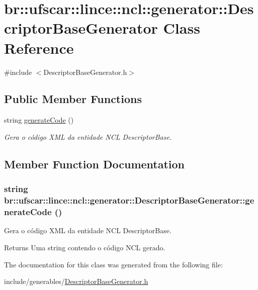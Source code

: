 \hypertarget{classbr_1_1ufscar_1_1lince_1_1ncl_1_1generator_1_1DescriptorBaseGenerator}{
\section{br::ufscar::lince::ncl::generator::DescriptorBaseGenerator Class Reference}
\label{classbr_1_1ufscar_1_1lince_1_1ncl_1_1generator_1_1DescriptorBaseGenerator}
}


{\ttfamily \#include $<$DescriptorBaseGenerator.h$>$}

\subsection*{Public Member Functions}
\begin{DoxyCompactItemize}
\item 
string \hyperlink{classbr_1_1ufscar_1_1lince_1_1ncl_1_1generator_1_1DescriptorBaseGenerator_a7b3d8c8df9e94e236e11f384b167e22e}{generateCode} ()
\begin{DoxyCompactList}\small\item\em Gera o código XML da entidade NCL DescriptorBase. \item\end{DoxyCompactList}\end{DoxyCompactItemize}


\subsection{Member Function Documentation}
\hypertarget{classbr_1_1ufscar_1_1lince_1_1ncl_1_1generator_1_1DescriptorBaseGenerator_a7b3d8c8df9e94e236e11f384b167e22e}{
\subsubsection[{generateCode}]{\setlength{\rightskip}{0pt plus 5cm}string br::ufscar::lince::ncl::generator::DescriptorBaseGenerator::generateCode ()}}
\label{classbr_1_1ufscar_1_1lince_1_1ncl_1_1generator_1_1DescriptorBaseGenerator_a7b3d8c8df9e94e236e11f384b167e22e}


Gera o código XML da entidade NCL DescriptorBase. 

\begin{DoxyReturn}{Returns}
Uma string contendo o código NCL gerado. 
\end{DoxyReturn}


The documentation for this class was generated from the following file:\begin{DoxyCompactItemize}
\item 
include/generables/\hyperlink{DescriptorBaseGenerator_8h}{DescriptorBaseGenerator.h}\end{DoxyCompactItemize}
